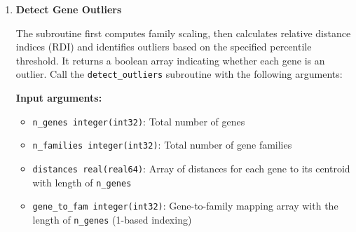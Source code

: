 \begin{enumerate}
\begin{enumerate}
\begin{itemize}
                    \item \texttt{vec2 real(real64):} Second expression vector as
                          array with length of dimension \texttt{d}
                          
                    \item \texttt{d integer(int32):} Dimension value
                  \end{itemize}
                  
                  \textbf{Output arguments:}
                  \begin{itemize}
                    \item \texttt{result real(real64):} Euclidean distance value
                          between \texttt{vec1} and \texttt{vec2}
                  \end{itemize}
                  \begin{lstlisting}[language=Fortran, caption={Euclidean distance calculation}]
call euclidean_distance(vec1, vec2, d, result)
                  \end{lstlisting}
          \end{enumerate}
          
    \item \textbf{Detect Gene Outliers}
          
          The subroutine first computes family scaling, then calculates relative
          distance indices (RDI) and identifies outliers based on the specified
          percentile threshold. It returns a boolean array indicating whether each
          gene is an outlier. Call the \texttt{detect\_outliers} subroutine with
          the following arguments:
          
          \textbf{Input arguments:}
          \begin{itemize}
            \item \texttt{n\_genes integer(int32)}: Total number of genes
                  
            \item \texttt{n\_families integer(int32)}: Total number of gene families
                  
            \item \texttt{distances real(real64)}: Array of distances for each gene
                  to its centroid with length of \texttt{n\_genes}
                  
            \item \texttt{gene\_to\_fam integer(int32)}: Gene-to-family mapping array
                  with the length of \texttt{n\_genes} (1-based indexing)
                  

\end{itemize}
\end{enumerate}
